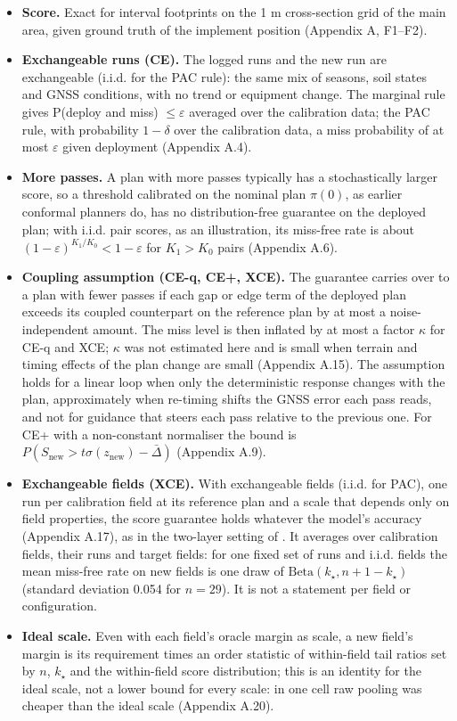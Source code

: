 \documentclass[preprint,12pt,authoryear]{elsarticle}
\providecommand{\tightlist}{\setlength{\itemsep}{0pt}\setlength{\parskip}{0pt}}
\begin{document}
\begin{itemize}
\tightlist
\item
  \textbf{Score.} Exact for interval footprints on the 1 m cross-section grid of the main area, given ground truth of the implement position (Appendix A, F1--F2).
\item
  \textbf{Exchangeable runs (CE).} The logged runs and the new run are exchangeable (i.i.d. for the PAC rule): the same mix of seasons, soil states and GNSS conditions, with no trend or equipment change. The marginal rule gives P(deploy and miss) \(\le\varepsilon\) averaged over the calibration data; the PAC rule, with probability \(1-\delta\) over the calibration data, a miss probability of at most \(\varepsilon\) given deployment (Appendix A.4).
\item
  \textbf{More passes.} A plan with more passes typically has a stochastically larger score, so a threshold calibrated on the nominal plan \(\pi(0)\), as earlier conformal planners do, has no distribution-free guarantee on the deployed plan; with i.i.d. pair scores, as an illustration, its miss-free rate is about \((1-\varepsilon)^{K_1/K_0}<1-\varepsilon\) for \(K_1>K_0\) pairs (Appendix A.6).
\item
  \textbf{Coupling assumption (CE-q, CE+, XCE).} The guarantee carries over to a plan with fewer passes if each gap or edge term of the deployed plan exceeds its coupled counterpart on the reference plan by at most a noise-independent amount. The miss level is then inflated by at most a factor \(\kappa\) for CE-q and XCE; \(\kappa\) was not estimated here and is small when terrain and timing effects of the plan change are small (Appendix A.15). The assumption holds for a linear loop when only the deterministic response changes with the plan, approximately when re-timing shifts the GNSS error each pass reads, and not for guidance that steers each pass relative to the previous one. For CE+ with a non-constant normaliser the bound is \(P(S_\mathrm{new}>t\sigma(z_\mathrm{new})-\bar\Delta)\) (Appendix A.9).
\item
  \textbf{Exchangeable fields (XCE).} With exchangeable fields (i.i.d. for PAC), one run per calibration field at its reference plan and a scale that depends only on field properties, the score guarantee holds whatever the model's accuracy (Appendix A.17), as in the two-layer setting of \citet{dunn2023}. It averages over calibration fields, their runs and target fields: for one fixed set of runs and i.i.d. fields the mean miss-free rate on new fields is one draw of \(\mathrm{Beta}(k_\star,n+1-k_\star)\) (standard deviation 0.054 for \(n=29\)). It is not a statement per field or configuration.
\item
  \textbf{Ideal scale.} Even with each field's oracle margin as scale, a new field's margin is its requirement times an order statistic of within-field tail ratios set by \(n\), \(k_\star\) and the within-field score distribution; this is an identity for the ideal scale, not a lower bound for every scale: in one cell raw pooling was cheaper than the ideal scale (Appendix A.20).
\end{itemize}
\end{document}
